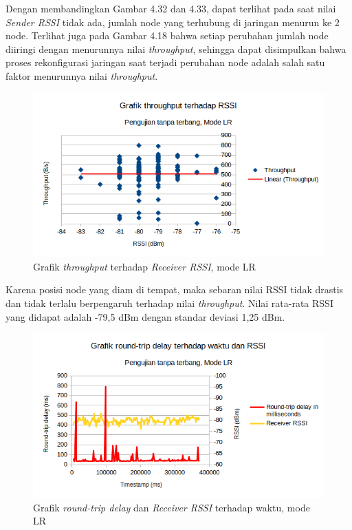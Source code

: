 Dengan membandingkan Gambar 4.32 dan 4.33, dapat terlihat pada saat nilai \textit{Sender RSSI} tidak ada, jumlah node yang terhubung di jaringan menurun ke 2 node. Terlihat juga pada Gambar 4.18 bahwa setiap perubahan jumlah node diiringi dengan menurunnya nilai \textit{throughput}, sehingga dapat disimpulkan bahwa proses rekonfigurasi jaringan saat terjadi perubahan node adalah salah satu faktor menurunnya nilai \textit{throughput}.
\begin{figure}[H]
	\centering
	\includegraphics[scale=0.7]{./assets/Graphs/NoFly_LR/Throughput-RSSI}
	\caption{Grafik \textit{throughput} terhadap \textit{Receiver RSSI}, mode LR}
\end{figure}
Karena posisi node yang diam di tempat, maka sebaran nilai RSSI tidak drastis dan tidak terlalu berpengaruh terhadap nilai \textit{throughput}. Nilai rata-rata RSSI yang didapat adalah -79,5 dBm dengan standar deviasi 1,25 dBm.
\begin{figure}[H]
	\centering
	\includegraphics[scale=0.7]{./assets/Graphs/NoFly_LR/Delay-Time}
	\caption{Grafik \textit{round-trip delay} dan \textit{Receiver RSSI} terhadap waktu, mode LR}
\end{figure}
